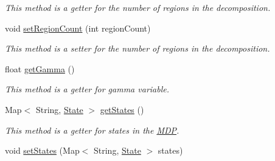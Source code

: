 \begin{DoxyCompactItemize}
\begin{DoxyCompactList}\small\item\em This method is a getter for the number of regions in the decomposition. \end{DoxyCompactList}\item 
\hypertarget{classese_1_1seas_1_1upenn_1_1edu_1_1_m_d_p_a37af1210f805afd89c3a047f2d0d88c9}{}void \hyperlink{classese_1_1seas_1_1upenn_1_1edu_1_1_m_d_p_a37af1210f805afd89c3a047f2d0d88c9}{set\+Region\+Count} (int region\+Count)\label{classese_1_1seas_1_1upenn_1_1edu_1_1_m_d_p_a37af1210f805afd89c3a047f2d0d88c9}

\begin{DoxyCompactList}\small\item\em This method is a setter for the number of regions in the decomposition. \end{DoxyCompactList}\item 
\hypertarget{classese_1_1seas_1_1upenn_1_1edu_1_1_m_d_p_ad3bebff77c92d587d4cf2e54c606a6a2}{}float \hyperlink{classese_1_1seas_1_1upenn_1_1edu_1_1_m_d_p_ad3bebff77c92d587d4cf2e54c606a6a2}{get\+Gamma} ()\label{classese_1_1seas_1_1upenn_1_1edu_1_1_m_d_p_ad3bebff77c92d587d4cf2e54c606a6a2}

\begin{DoxyCompactList}\small\item\em This method is a getter for gamma variable. \end{DoxyCompactList}\item 
\hypertarget{classese_1_1seas_1_1upenn_1_1edu_1_1_m_d_p_a368f9fd64246a2a066f98ae229ccc9ab}{}Map$<$ String, \hyperlink{classese_1_1seas_1_1upenn_1_1edu_1_1_state}{State} $>$ \hyperlink{classese_1_1seas_1_1upenn_1_1edu_1_1_m_d_p_a368f9fd64246a2a066f98ae229ccc9ab}{get\+States} ()\label{classese_1_1seas_1_1upenn_1_1edu_1_1_m_d_p_a368f9fd64246a2a066f98ae229ccc9ab}

\begin{DoxyCompactList}\small\item\em This method is a getter for states in the \hyperlink{classese_1_1seas_1_1upenn_1_1edu_1_1_m_d_p}{M\+D\+P}. \end{DoxyCompactList}\item 
\hypertarget{classese_1_1seas_1_1upenn_1_1edu_1_1_m_d_p_ab3157a2894a6adecd450820fe863048b}{}void \hyperlink{classese_1_1seas_1_1upenn_1_1edu_1_1_m_d_p_ab3157a2894a6adecd450820fe863048b}{set\+States} (Map$<$ String, \hyperlink{classese_1_1seas_1_1upenn_1_1edu_1_1_state}{State} $>$ states)\label{classese_1_1seas_1_1upenn_1_1edu_1_1_m_d_p_ab3157a2894a6adecd450820fe863048b}


\end{DoxyCompactItemize}
